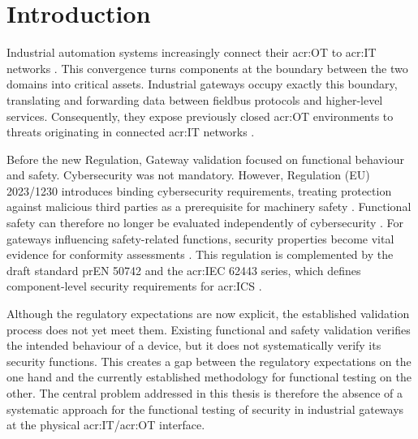 \chapter{Introduction} 
\label{chap:introduction} 


Industrial automation systems increasingly connect their \gls{acr:OT} to \gls{acr:IT} networks \autocite[2, 9]{EHIE2020103166}. This convergence turns components at the boundary between the two domains into critical assets. Industrial gateways occupy exactly this boundary, translating and forwarding data between fieldbus protocols and higher-level services. Consequently, they expose previously closed \gls{acr:OT} environments to threats originating in connected \gls{acr:IT} networks \autocite[199]{8586807} \cite[p. 33]{enisa2018iot_smart_manufacturing}.



Before the new Regulation, Gateway validation focused on functional behaviour and safety. Cybersecurity was not mandatory. However, Regulation (EU) 2023/1230 introduces binding cybersecurity requirements, treating protection against malicious third parties as a prerequisite for machinery safety \autocite[5]{EU2023_1230}. Functional safety can therefore no longer be evaluated independently of cybersecurity \autocite{carl2026_maschinenverordnung}. For gateways influencing safety-related functions, security properties become vital evidence for conformity assessments \cite[pp. 1]{tuv_functional_safety_cybersecurity_faq_pdf}. This regulation is complemented by the draft standard prEN 50742 and the \gls{acr:IEC} 62443 series, which defines component-level security requirements for \gls{acr:ICS} \autocite{prEN50742_2025, IEC62443-4-2}.


Although the regulatory expectations are now explicit, the established validation process does not yet meet them. Existing functional and safety validation verifies the intended behaviour of a device, but it does not systematically verify its security functions. This creates a gap between the regulatory expectations on the one hand and the currently established methodology for functional testing on the other. The central problem addressed in this thesis is therefore the absence of a systematic approach for the functional testing of security in industrial gateways at the physical \gls{acr:IT}/\gls{acr:OT} interface.

